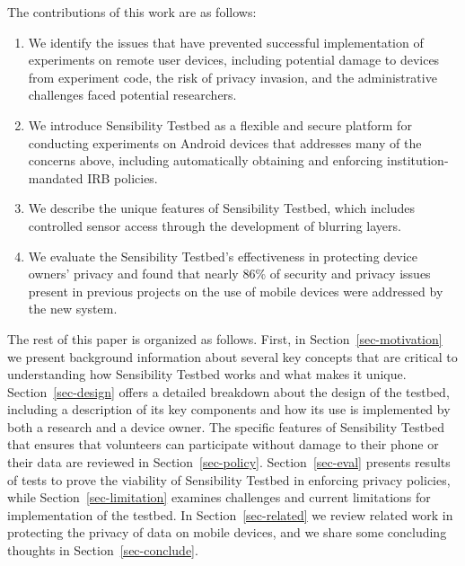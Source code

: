 The contributions of this work are as follows:

\begin{enumerate}
\item We identify the issues that have prevented successful implementation
of experiments on remote user devices, including potential damage to
devices from experiment code, the risk of privacy invasion, and the
administrative challenges faced potential researchers. 

\item We introduce Sensibility Testbed as a flexible and secure platform for
conducting experiments on Android devices that addresses many of the
concerns above, including automatically obtaining and enforcing 
institution-mandated IRB policies.

\item We describe the unique features of Sensibility Testbed, which includes 
controlled sensor access through the development of blurring layers.

\item We evaluate the Sensibility Testbed's effectiveness in
protecting device owners' privacy and found that nearly 86\% of
security and privacy issues present in previous projects on the use of
mobile devices were addressed by the new system.
\end{enumerate}

The rest of this paper is organized as follows. First, in Section~\ref{sec-motivation} we
present background information about several key concepts that are
critical to understanding how Sensibility Testbed works and what makes
it unique. Section~\ref{sec-design} offers a detailed breakdown about the design of
the testbed, including a description of its key components and how its
use is implemented by both a research and a device owner. The specific
features of Sensibility Testbed that ensures that volunteers can
participate without damage to their phone or their data are reviewed
in Section~\ref{sec-policy}. Section~\ref{sec-eval} presents results of tests to prove the
viability of Sensibility Testbed in enforcing privacy policies, while
Section~\ref{sec-limitation} examines challenges and current limitations for
implementation of the testbed. In Section~\ref{sec-related} we review related work
in protecting the privacy of data on mobile devices, and we share some
concluding thoughts in Section~\ref{sec-conclude}.

